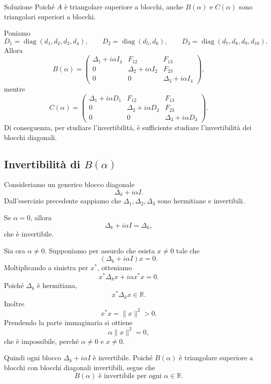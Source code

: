 \documentclass[a4paper]{article}
\begin{document}
\begin{snippetsolution}{Soluzione}
    Poiché \(A\) è triangolare superiore a blocchi, anche \(B(\alpha)\) e \(C(\alpha)\) sono triangolari superiori a blocchi.

    Poniamo
    \[
        D_1=\operatorname{diag}(d_1,d_2,d_3,d_4),
        \qquad
        D_2=\operatorname{diag}(d_5,d_6),
        \qquad
        D_3=\operatorname{diag}(d_7,d_8,d_9,d_{10}).
    \]
    Allora
    \[
        B(\alpha)=
        \begin{pmatrix}
            \Delta_1+i\alpha I_4 & F_{12} & F_{13}\\
            0 & \Delta_2+i\alpha I_2 & F_{23}\\
            0 & 0 & \Delta_3+i\alpha I_4
        \end{pmatrix},
    \]
    mentre
    \[
        C(\alpha)=
        \begin{pmatrix}
            \Delta_1+i\alpha D_1 & F_{12} & F_{13}\\
            0 & \Delta_2+i\alpha D_2 & F_{23}\\
            0 & 0 & \Delta_3+i\alpha D_3
        \end{pmatrix}.
    \]
    Di conseguenza, per studiare l'invertibilità, è sufficiente studiare l'invertibilità dei blocchi diagonali.

    \subsection*{Invertibilità di \(B(\alpha)\)}

    Consideriamo un generico blocco diagonale
    \[
        \Delta_k+i\alpha I.
    \]
    Dall'esercizio precedente sappiamo che \(\Delta_1,\Delta_2,\Delta_3\) sono hermitiane e invertibili.

    Se \(\alpha=0\), allora
    \[
        \Delta_k+i\alpha I=\Delta_k,
    \]
    che è invertibile.

    Sia ora \(\alpha\neq 0\). Supponiamo per assurdo che esista \(x\neq 0\) tale che
    \[
        (\Delta_k+i\alpha I)x=0.
    \]
    Moltiplicando a sinistra per \(x^*\), otteniamo
    \[
        x^*\Delta_kx+i\alpha x^*x=0.
    \]
    Poiché \(\Delta_k\) è hermitiana,
    \[
        x^*\Delta_kx\in\mathbb{R}.
    \]
    Inoltre
    \[
        x^*x=\|x\|^2>0.
    \]
    Prendendo la parte immaginaria si ottiene
    \[
        \alpha \|x\|^2=0,
    \]
    che è impossibile, perché \(\alpha\neq 0\) e \(x\neq 0\).

    Quindi ogni blocco \(\Delta_k+i\alpha I\) è invertibile. Poiché \(B(\alpha)\) è triangolare superiore a blocchi con blocchi diagonali invertibili, segue che
    \[
        B(\alpha) \text{ è invertibile per ogni } \alpha\in\mathbb{R}.
    \]


\end{snippetsolution}
\end{document}
